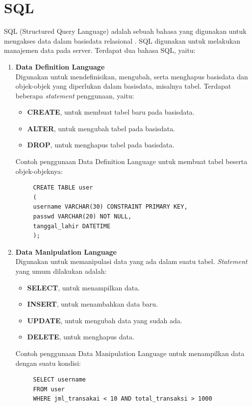 \section{SQL}
\label{sec:sql}
SQL (Structured Query Language) adalah sebuah bahasa yang digunakan untuk mengakses data dalam basisdata relasional \cite{sql}. SQL digunakan untuk melakukan manajemen data pada server. Terdapat dua bahasa SQL, yaitu:
\begin{enumerate}
	\item \textbf{Data Definition Language}\\
	Digunakan untuk mendefinisikan, mengubah, serta menghapus basisdata dan objek-objek yang diperlukan dalam basisdata, misalnya tabel. Terdapat beberapa \textit{statement} penggunaan, yaitu:
	\begin{itemize}
		\item \textbf{CREATE}, untuk membuat tabel baru pada basisdata.
		\item \textbf{ALTER}, untuk mengubah tabel pada basisdata.
		\item \textbf{DROP}, untuk menghapus tabel pada basisdata.
	\end{itemize}	
	Contoh penggunaan Data Definition Language untuk membuat tabel beserta objek-objeknya:
	\begin{lstlisting}
	 CREATE TABLE user
	 (
	 username VARCHAR(30) CONSTRAINT PRIMARY KEY,
	 passwd VARCHAR(20) NOT NULL,
	 tanggal_lahir DATETIME
	 );
	\end{lstlisting}
	\item \textbf{Data Manipulation Language}\\
	Digunakan untuk memanipulasi data yang ada dalam suatu tabel. \textit{Statement} yang umum dilakukan adalah:
	\begin{itemize}
		\item \textbf{SELECT}, untuk menampilkan data.
		\item \textbf{INSERT}, untuk menambahkan data baru.
		\item \textbf{UPDATE}, untuk mengubah data yang sudah ada.
		\item \textbf{DELETE}, untuk menghapus data.
	\end{itemize}	
	Contoh penggunaan Data Manipulation Language untuk menampilkan data dengan suatu kondisi:
	\begin{lstlisting}
	 SELECT username
	 FROM user
	 WHERE jml_transakai < 10 AND total_transaksi > 1000
	\end{lstlisting}
\end{enumerate}

